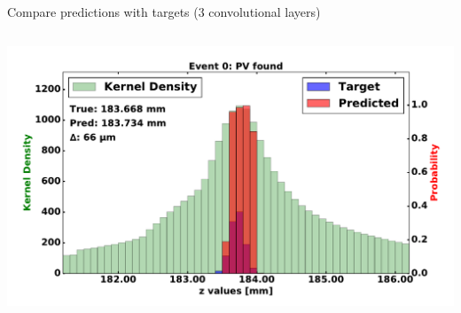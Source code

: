 \begin{frame}{Compare predictions with targets (3 convolutional layers)}
\begin{columns}[c]
\begin{center}
           \includegraphics[width=1\textwidth, height=0.45\textwidth, trim=18 0 18 0]{images/120000_3layer_03.pdf}
       \end{center}
  \end{columns}
\end{frame}


